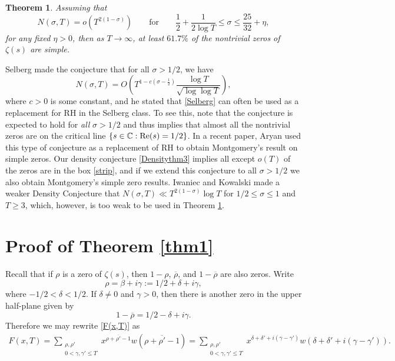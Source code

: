 \documentclass{amsart}
\newcommand{\1}{\mathbbm{1}}
\newtheorem{theorem}{Theorem}%
\theoremstyle{remark}
\numberwithin{equation}{section}
\begin{document}
\begin{theorem}\label{thm3} Assuming that 
\begin{equation}\label{Densitythm3} N(\sigma, T) = o\left( T^{2(1-\sigma)}\right) \qquad \text{for} \qquad \frac1{2} + \frac1{2\log T} \le \sigma \le \frac{25}{32}+\eta, \end{equation}
for any fixed $\eta>0$, then as $T\to \infty$, at least $61.7 \%$ of the nontrivial zeros of $\zeta(s)$ are simple. \end{theorem}

Selberg \cite{SelCollected2} made the conjecture that for all $\sigma>1/2$, we have
\begin{equation}\label{Selberg}
N(\sigma,T) = O\left( T^{1-c(\sigma-\frac12)} \frac{\log T}{\sqrt{\log \log T}}\right),
\end{equation}
where $c>0$ is some constant, and he stated that \eqref{Selberg} can often be used as a replacement for RH in the Selberg class. To see this, note that the conjecture is expected to hold for \emph{all} $\sigma>1/2$ and thus implies that almost all the nontrivial zeros are on the critical line $\{s\in\mathbb{C} : {\rm Re}(s)=1/2\}$. In a recent paper, Aryan \cite{Ary22} used this type of conjecture as a replacement of RH to obtain Montgomery's result on simple zeros. Our density conjecture \eqref{Densitythm3} implies all except $o(T)$ of the zeros are in the box \eqref{strip}, and if we extend this conjecture to all $\sigma>1/2$ we also obtain Montgomery's simple zero results. Iwaniec and Kowalski \cite[p. 249]{IK04} made a weaker Density Conjecture that $ N(\sigma,T) \ll T^{2(1-\sigma)} \log T$ for $1/2\le \sigma \le 1 $ and $T\ge 3$,
which, however, is too weak to be used in Theorem \ref{thm3}.


\section{Proof of Theorem \ref{thm1}}

Recall that if $\rho$ is a zero of $\zeta(s)$, then $1-\rho$, $\overline{\rho}$, and $1-\overline{\rho}$ are also zeros. Write 
\begin{equation*}%
\rho = \beta +i\gamma := 1/2 +\delta + i\gamma,
\end{equation*}
where $-1/2<\delta <1/2$. If $\delta\neq 0$ and $\gamma >0$, then there is another zero in the upper half-plane given by
\[ 1-\overline{\rho} = 1/2 -\delta + i\gamma.\]
Therefore we may rewrite \eqref{F(x,T)} as 
\begin{equation}\label{F(x,T)2}
\begin{aligned}
F(x,T) = \sum_{\substack{\rho, \rho' \\ 0<\gamma,\gamma' \le T}} x^{\rho+\overline{\rho'}-1}w(\rho+\overline{\rho'}-1)= \sum_{\substack{\rho, \rho' \\ 0<\gamma,\gamma' \le T}} x^{\delta +\delta' +i(\gamma-\gamma')}w(\delta +\delta' +i(\gamma-\gamma')).
\end{aligned}
\end{equation}
\end{document}
